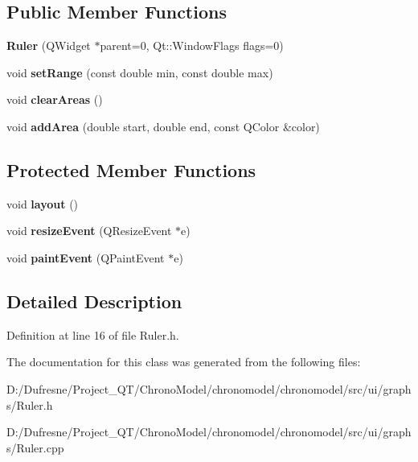 \subsection*{Public Member Functions}
\begin{DoxyCompactItemize}
\item 
\hypertarget{class_ruler_a4cbcf9a0d96e349054dcb8cab328b1a3}{{\bfseries Ruler} (Q\-Widget $\ast$parent=0, Qt\-::\-Window\-Flags flags=0)}\label{class_ruler_a4cbcf9a0d96e349054dcb8cab328b1a3}

\item 
\hypertarget{class_ruler_a5b1918c5c7d1fd6da20d3b27370a4216}{void {\bfseries set\-Range} (const double min, const double max)}\label{class_ruler_a5b1918c5c7d1fd6da20d3b27370a4216}

\item 
\hypertarget{class_ruler_a4dbf72a1314dc0afa64782bbc6723feb}{void {\bfseries clear\-Areas} ()}\label{class_ruler_a4dbf72a1314dc0afa64782bbc6723feb}

\item 
\hypertarget{class_ruler_a3f79454661142172684a52c0b88761f8}{void {\bfseries add\-Area} (double start, double end, const Q\-Color \&color)}\label{class_ruler_a3f79454661142172684a52c0b88761f8}

\end{DoxyCompactItemize}
\subsection*{Protected Member Functions}
\begin{DoxyCompactItemize}
\item 
\hypertarget{class_ruler_ad7d9ae7df14ef59b9af7d1798aa1ace4}{void {\bfseries layout} ()}\label{class_ruler_ad7d9ae7df14ef59b9af7d1798aa1ace4}

\item 
\hypertarget{class_ruler_a17ef00f8af8126b3563fabf4e8e45e9e}{void {\bfseries resize\-Event} (Q\-Resize\-Event $\ast$e)}\label{class_ruler_a17ef00f8af8126b3563fabf4e8e45e9e}

\item 
\hypertarget{class_ruler_a5bac007307b2e492023f94d3fa4ab8b3}{void {\bfseries paint\-Event} (Q\-Paint\-Event $\ast$e)}\label{class_ruler_a5bac007307b2e492023f94d3fa4ab8b3}

\end{DoxyCompactItemize}


\subsection{Detailed Description}


Definition at line 16 of file Ruler.\-h.



The documentation for this class was generated from the following files\-:\begin{DoxyCompactItemize}
\item 
D\-:/\-Dufresne/\-Project\-\_\-\-Q\-T/\-Chrono\-Model/chronomodel/chronomodel/src/ui/graphs/Ruler.\-h\item 
D\-:/\-Dufresne/\-Project\-\_\-\-Q\-T/\-Chrono\-Model/chronomodel/chronomodel/src/ui/graphs/Ruler.\-cpp\end{DoxyCompactItemize}
